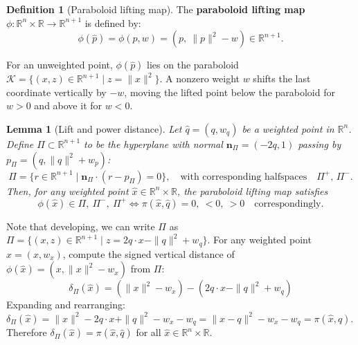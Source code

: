 \documentclass[12pt]{article}
\makeatletter
\newtheorem{lemma}[theorem]{Lemma}
\theoremstyle{definition}
\newtheorem{definition}[theorem]{Definition}
\theoremstyle{remark}
\renewenvironment{proof}[1][\proofname]{\par
  \pushQED{\qed}%
  \normalfont \footnotesize \topsep6\p@\@plus6\p@\relax
  \list{}{\leftmargin=2em
          \settowidth{\itemindent}{\itshape#1}%
          \labelwidth=\itemindent
          \parsep=0pt \listparindent=\parindent 
  }
  \item[\hskip\labelsep
        \itshape
    #1\@addpunct{.}]\ignorespaces
}{%
  \popQED\endlist\@endpefalse
}
\makeatother
\begin{document}
\begin{definition}[Paraboloid lifting map]
The \textbf{paraboloid lifting map} $\phi: \mathbb{R}^n \times \mathbb{R} \to 
\mathbb{R}^{n+1}$ is defined by:
\begin{equation*}
\phi(\hat p) = \phi(p, w) = (p,\ \|p\|^2 - w) \in \mathbb{R}^{n+1}.
\end{equation*}
\end{definition}

For an unweighted point, $\phi(\hat p)$ lies on the paraboloid $\mathcal{K} = \{ (x, z) \in \mathbb{R}^{n+1} \mid z = \|x\|^2 \}$. A nonzero weight $w$ shifts the last coordinate vertically by $-w$, moving the lifted point below the paraboloid for $w > 0$ and above it for $w < 0$.

\begin{lemma}[Lift and power distance]\label{lemma:lift_power_dist}
    Let $\hat q = (q, w_q)$ be a weighted point in $\mathbb{R}^n$. Define $\Pi \subset \mathbb{R}^{n+1}$ to be the hyperplane with normal $\mathbf{n}_\Pi = (-2 q, 1)$ passing by $p_\Pi= (q, \| q\|^2 + w_p)$:
\begin{equation*}
\Pi = \{ r \in \mathbb{R}^{n+1} \mid \mathbf{n}_\Pi \cdot (r - p_\Pi) = 0\}, \quad \text{with corresponding halfspaces} \quad \Pi^+,\, \Pi^-.
\end{equation*}
Then, for any weighted point $\hat x \in \mathbb{R}^n \times \mathbb{R}$, the paraboloid lifting map satisfies
\begin{equation*}
\phi(\hat x) \in \Pi,\ \Pi^-,\ \Pi^+ \iff \pi(\hat x, \hat q) = 0,\ < 0,\ > 0 \quad \text{correspondingly}.
\end{equation*}
\end{lemma}

\begin{proof}
Note that developing, we can write $\Pi$ as $\Pi = \{(x, z) \in \mathbb{R}^{n+1} \mid z = 2 q \cdot x - \|q\|^2 + w_q \}$. For any weighted point $\hat x = (x, w_x)$, compute the signed vertical distance of $\phi(\hat x) = (x, \|x\|^2 - w_x)$ from $\Pi$:
\begin{equation*}
\delta_\Pi(\hat x) = (\|x\|^2 - w_x) - (2q \cdot x - \|q\|^2 + w_q)
\end{equation*}
Expanding and rearranging:
$
\delta_\Pi(\hat x) = \|x\|^2 - 2q \cdot x + \|q\|^2 - w_x - w_q 
= \|x - q\|^2 - w_x - w_q = \pi(\hat x, \hat q)
$.
Therefore $\delta_\Pi(\hat x) = \pi(\hat x, \hat q)$ for all $\hat x \in 
\mathbb{R}^n \times \mathbb{R}$. 
\end{proof}
\end{document}
